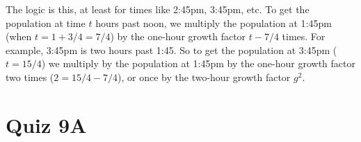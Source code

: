 \documentclass{ximera}
\begin{document}
\begin{question}
\begin{explanation}
\begin{enumerate}
The logic is this, at least for times like 2:45pm, 3:45pm, etc. To get the population at time $t$ hours past noon, we multiply the population at 1:45pm (when $t = 1 + 3/4 = 7/4$) by the one-hour growth factor $t-7/4$ times. For example, 3:45pm is two hours past 1:45. So to get the population at 3:45pm ($t=15/4$) we multiply by the population at 1:45pm by the one-hour growth factor two times ($2 = 15/4 - 7/4$), or once by the two-hour growth factor $g^2$.

\end{enumerate}
\end{explanation}
\end{question}

\section{Quiz 9A}
\end{document}

